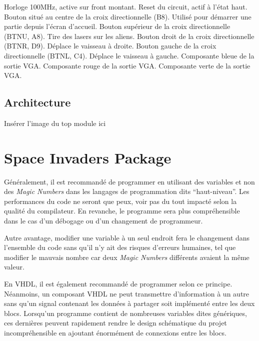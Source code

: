 \documentclass[french]{nakrule}
\begin{document}
\begin{descr}
   Horloge 100MHz, active sur front montant.
   Reset du circuit, actif à l'état haut.
   Bouton situé au centre de la croix directionnelle (B8).
  Utilisé pour démarrer une partie depuis l'écran d'accueil.
   Bouton supérieur de la croix directionnelle (BTNU, A8). Tire des lasers sur les aliens.
   Bouton droit de la croix directionnelle (BTNR, D9). Déplace le vaisseau à droite.
   Bouton gauche de la croix directionnelle (BTNL, C4). Déplace le vaisseau à gauche.
   Composante bleue de la sortie VGA.
   Composante rouge de la sortie VGA.
   Composante verte de la sortie VGA.
\end{descr}

\clearpage

\subsection{Architecture}
\label{sub:architecture}

Insérer l'image du top module ici

\clearpage


\section{Space Invaders Package}
\label{sec:package}

Généralement, il est recommandé de programmer en utilisant des variables et non
des \emph{Magic Numbers} dans les langages de programmation dits
``haut-niveau''. Les performances du code ne seront que peux, voir pas du tout
impacté selon la qualité du compilateur. En revanche, le programme sera plus
compréhensible dans le cas d'un débogage ou d'un changement de programmeur.

Autre avantage, modifier une variable à un seul endroit fera le changement dans
l'ensemble du code sans qu'il n'y ait des risques d'erreurs humaines, tel que
modifier le mauvais nombre car deux \emph{Magic Numbers} différents avaient la
même valeur.

En VHDL, il est également recommandé de programmer selon ce principe. Néanmoins,
un composant VHDL ne peut transmettre d'information à un autre sans qu'un signal
contenant les données à partager soit implémenté entre les deux blocs. Lorsqu'un
programme contient de nombreuses variables dites génériques, ces dernières peuvent
rapidement rendre le design schématique du projet incompréhensible en ajoutant
énormément de connexions entre les blocs.
\end{document}
